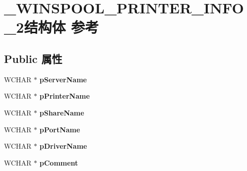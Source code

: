 \hypertarget{struct___w_i_n_s_p_o_o_l___p_r_i_n_t_e_r___i_n_f_o__2}{}\section{\+\_\+\+W\+I\+N\+S\+P\+O\+O\+L\+\_\+\+P\+R\+I\+N\+T\+E\+R\+\_\+\+I\+N\+F\+O\+\_\+2结构体 参考}
\label{struct___w_i_n_s_p_o_o_l___p_r_i_n_t_e_r___i_n_f_o__2}
\subsection*{Public 属性}
\begin{DoxyCompactItemize}
\item 
\mbox{\label{struct___w_i_n_s_p_o_o_l___p_r_i_n_t_e_r___i_n_f_o__2_a38008b4547b1909776d6e147770c5902}} 
W\+C\+H\+AR $\ast$ {\bfseries p\+Server\+Name}
\item 
\mbox{\label{struct___w_i_n_s_p_o_o_l___p_r_i_n_t_e_r___i_n_f_o__2_a6b8897ac95f8c09016d62138363bca81}} 
W\+C\+H\+AR $\ast$ {\bfseries p\+Printer\+Name}
\item 
\mbox{\label{struct___w_i_n_s_p_o_o_l___p_r_i_n_t_e_r___i_n_f_o__2_ad12b0980e5be8aeb367792ab7937d8f9}} 
W\+C\+H\+AR $\ast$ {\bfseries p\+Share\+Name}
\item 
\mbox{\label{struct___w_i_n_s_p_o_o_l___p_r_i_n_t_e_r___i_n_f_o__2_a8d868997cfb07cac0eb154d6cdb749f6}} 
W\+C\+H\+AR $\ast$ {\bfseries p\+Port\+Name}
\item 
\mbox{\label{struct___w_i_n_s_p_o_o_l___p_r_i_n_t_e_r___i_n_f_o__2_a30e1a0708635bb1f28a54eae7f01ec44}} 
W\+C\+H\+AR $\ast$ {\bfseries p\+Driver\+Name}
\item 
\mbox{\label{struct___w_i_n_s_p_o_o_l___p_r_i_n_t_e_r___i_n_f_o__2_a4bf30f5aa1874d69d5392da5a8f3d504}} 
W\+C\+H\+AR $\ast$ {\bfseries p\+Comment}

\end{DoxyCompactItemize}

